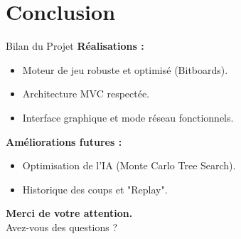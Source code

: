 \documentclass{beamer}
\begin{document}
\section{Conclusion}
\begin{frame}{Bilan du Projet}
    \textbf{Réalisations :}
    \begin{itemize}
        \item Moteur de jeu robuste et optimisé (Bitboards).
        \item Architecture MVC respectée.
        \item Interface graphique et mode réseau fonctionnels.
    \end{itemize}
    
    \vspace{0.5cm}
    \textbf{Améliorations futures :}
    \begin{itemize}
        \item Optimisation de l'IA (Monte Carlo Tree Search).
        \item Historique des coups et "Replay".
    \end{itemize}
    
    \vspace{1cm}
    \centering
    \Large \textbf{Merci de votre attention.} \\
    \small Avez-vous des questions ?
\end{frame}
\end{document}
